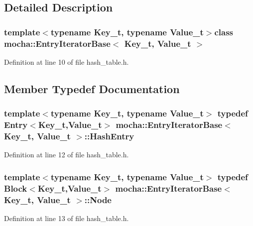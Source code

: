 \subsection{Detailed Description}
\subsubsection*{template$<$typename Key\_\-t, typename Value\_\-t$>$class mocha::EntryIteratorBase$<$ Key\_\-t, Value\_\-t $>$}



Definition at line 10 of file hash\_\-table.h.



\subsection{Member Typedef Documentation}
\hypertarget{classmocha_1_1_entry_iterator_base_a8bc02c1067df11a391cf565953e23b05}{
\subsubsection[{HashEntry}]{\setlength{\rightskip}{0pt plus 5cm}template$<$typename Key\_\-t, typename Value\_\-t$>$ typedef {\bf Entry}$<$Key\_\-t,Value\_\-t$>$ {\bf mocha::EntryIteratorBase}$<$ Key\_\-t, Value\_\-t $>$::{\bf HashEntry}}}
\label{classmocha_1_1_entry_iterator_base_a8bc02c1067df11a391cf565953e23b05}


Definition at line 12 of file hash\_\-table.h.

\hypertarget{classmocha_1_1_entry_iterator_base_a0c7fd5003d4f45319346ae64e6e111be}{
\subsubsection[{Node}]{\setlength{\rightskip}{0pt plus 5cm}template$<$typename Key\_\-t, typename Value\_\-t$>$ typedef {\bf Block}$<$Key\_\-t,Value\_\-t$>$ {\bf mocha::EntryIteratorBase}$<$ Key\_\-t, Value\_\-t $>$::{\bf Node}}}
\label{classmocha_1_1_entry_iterator_base_a0c7fd5003d4f45319346ae64e6e111be}


Definition at line 13 of file hash\_\-table.h.



